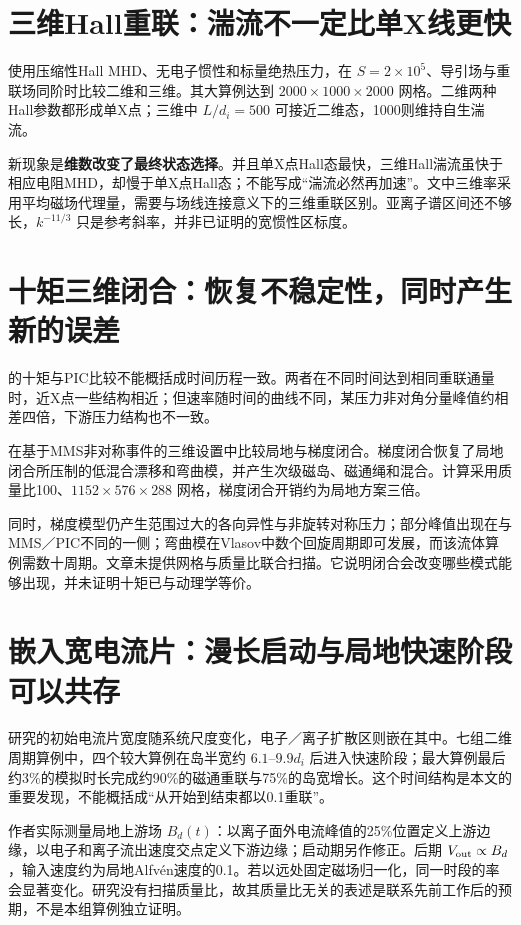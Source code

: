 \section{三维Hall重联：湍流不一定比单X线更快}
\citet{Huang2024}使用压缩性Hall MHD、无电子惯性和标量绝热压力，在 $S=2\times10^5$、导引场与重联场同阶时比较二维和三维。其大算例达到 $2000\times1000\times2000$ 网格。二维两种Hall参数都形成单X点；三维中 $L/d_i=500$ 可接近二维态，1000则维持自生湍流。

新现象是\textbf{维数改变了最终状态选择}。并且单X点Hall态最快，三维Hall湍流虽快于相应电阻MHD，却慢于单X点Hall态；不能写成“湍流必然再加速”。文中三维率采用平均磁场代理量，需要与场线连接意义下的三维重联区别。亚离子谱区间还不够长，$k^{-11/3}$ 只是参考斜率，并非已证明的宽惯性区标度。

\section{十矩三维闭合：恢复不稳定性，同时产生新的误差}
\citet{Wang2015}的十矩与PIC比较不能概括成时间历程一致。两者在不同时间达到相同重联通量时，近X点一些结构相近；但速率随时间的曲线不同，某压力非对角分量峰值约相差四倍，下游压力结构也不一致。

\citet{Closure2026}在基于MMS非对称事件的三维设置中比较局地与梯度闭合。梯度闭合恢复了局地闭合所压制的低混合漂移和弯曲模，并产生次级磁岛、磁通绳和混合。计算采用质量比100、$1152\times576\times288$ 网格，梯度闭合开销约为局地方案三倍。

同时，梯度模型仍产生范围过大的各向异性与非旋转对称压力；部分峰值出现在与MMS／PIC不同的一侧；弯曲模在Vlasov中数个回旋周期即可发展，而该流体算例需数十周期。文章未提供网格与质量比联合扫描。它说明闭合会改变哪些模式能够出现，并未证明十矩已与动理学等价。

\section{嵌入宽电流片：漫长启动与局地快速阶段可以共存}
\citet{Shay2004}研究的初始电流片宽度随系统尺度变化，电子／离子扩散区则嵌在其中。七组二维周期算例中，四个较大算例在岛半宽约 $6.1$--$9.9d_i$ 后进入快速阶段；最大算例最后约3\%的模拟时长完成约90\%的磁通重联与75\%的岛宽增长。这个时间结构是本文的重要发现，不能概括成“从开始到结束都以0.1重联”。

作者实际测量局地上游场 $B_d(t)$：以离子面外电流峰值的25\%位置定义上游边缘，以电子和离子流出速度交点定义下游边缘；启动期另作修正。后期 $V_{\rm out}\propto B_d$，输入速度约为局地Alfvén速度的0.1。若以远处固定磁场归一化，同一时段的率会显著变化。研究没有扫描质量比，故其质量比无关的表述是联系先前工作后的预期，不是本组算例独立证明。

